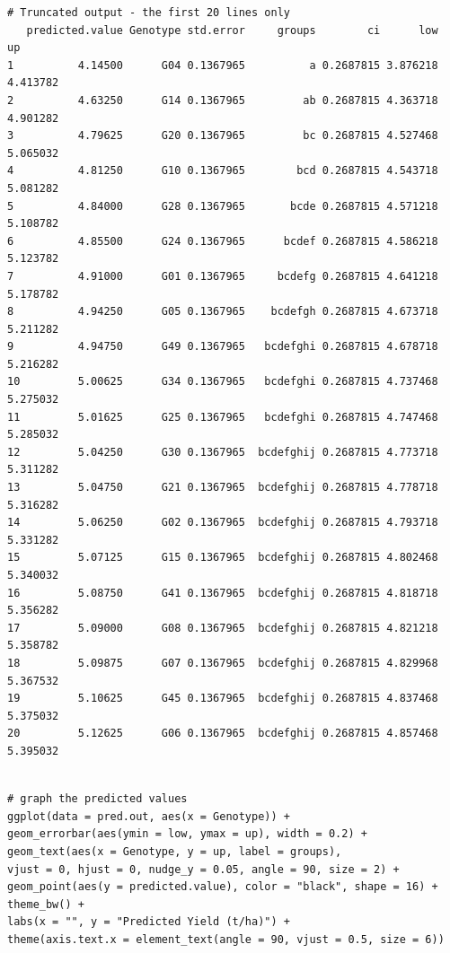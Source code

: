 \documentclass[a4paper, 10pt, fleqn, twosided]{memoir}
\begin{document}
\begin{tcolorbox}[title = Example 5 Tukey's multiple comparison output]
\begin{verbatim}
# Truncated output - the first 20 lines only
   predicted.value Genotype std.error     groups        ci      low       up
1          4.14500      G04 0.1367965          a 0.2687815 3.876218 4.413782
2          4.63250      G14 0.1367965         ab 0.2687815 4.363718 4.901282
3          4.79625      G20 0.1367965         bc 0.2687815 4.527468 5.065032
4          4.81250      G10 0.1367965        bcd 0.2687815 4.543718 5.081282
5          4.84000      G28 0.1367965       bcde 0.2687815 4.571218 5.108782
6          4.85500      G24 0.1367965      bcdef 0.2687815 4.586218 5.123782
7          4.91000      G01 0.1367965     bcdefg 0.2687815 4.641218 5.178782
8          4.94250      G05 0.1367965    bcdefgh 0.2687815 4.673718 5.211282
9          4.94750      G49 0.1367965   bcdefghi 0.2687815 4.678718 5.216282
10         5.00625      G34 0.1367965   bcdefghi 0.2687815 4.737468 5.275032
11         5.01625      G25 0.1367965   bcdefghi 0.2687815 4.747468 5.285032
12         5.04250      G30 0.1367965  bcdefghij 0.2687815 4.773718 5.311282
13         5.04750      G21 0.1367965  bcdefghij 0.2687815 4.778718 5.316282
14         5.06250      G02 0.1367965  bcdefghij 0.2687815 4.793718 5.331282
15         5.07125      G15 0.1367965  bcdefghij 0.2687815 4.802468 5.340032
16         5.08750      G41 0.1367965  bcdefghij 0.2687815 4.818718 5.356282
17         5.09000      G08 0.1367965  bcdefghij 0.2687815 4.821218 5.358782
18         5.09875      G07 0.1367965  bcdefghij 0.2687815 4.829968 5.367532
19         5.10625      G45 0.1367965  bcdefghij 0.2687815 4.837468 5.375032
20         5.12625      G06 0.1367965  bcdefghij 0.2687815 4.857468 5.395032
\end{verbatim}
\end{tcolorbox}

\begin{tcolorbox}[title = Example 5 Graph of predicted values]
\begin{verbatim} 
# graph the predicted values 
ggplot(data = pred.out, aes(x = Genotype)) +
geom_errorbar(aes(ymin = low, ymax = up), width = 0.2) +
geom_text(aes(x = Genotype, y = up, label = groups),
vjust = 0, hjust = 0, nudge_y = 0.05, angle = 90, size = 2) +
geom_point(aes(y = predicted.value), color = "black", shape = 16) + theme_bw() +
labs(x = "", y = "Predicted Yield (t/ha)") +
theme(axis.text.x = element_text(angle = 90, vjust = 0.5, size = 6))
\end{verbatim}
\end{tcolorbox}
\end{document}
